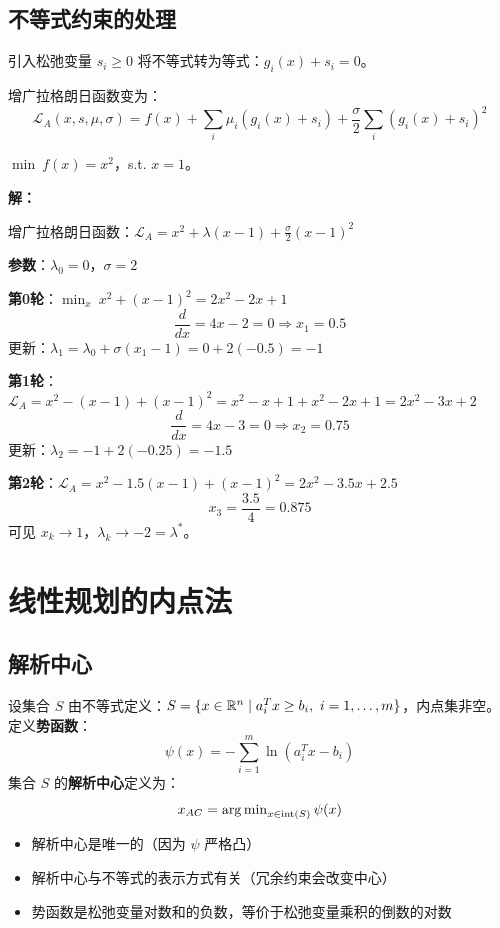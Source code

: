 \subsection{不等式约束的处理}

引入松弛变量 $s_i \geq 0$ 将不等式转为等式：$g_i(x) + s_i = 0$。

增广拉格朗日函数变为：
\[
\mathcal{L}_A(x, s, \mu, \sigma) = f(x) + \sum_i \mu_i(g_i(x) + s_i) + \frac{\sigma}{2}\sum_i (g_i(x) + s_i)^2
\]

\begin{example}\label{ex:alm}
$\min\ f(x) = x^2$，s.t. $x = 1$。

\textbf{解：}

增广拉格朗日函数：$\mathcal{L}_A = x^2 + \lambda(x-1) + \frac{\sigma}{2}(x-1)^2$

\textbf{参数}：$\lambda_0 = 0$，$\sigma = 2$

\textbf{第0轮}：$\min_x\ x^2 + (x-1)^2 = 2x^2 - 2x + 1$
\[
\frac{d}{dx} = 4x - 2 = 0 \Rightarrow x_1 = 0.5
\]
更新：$\lambda_1 = \lambda_0 + \sigma(x_1 - 1) = 0 + 2(-0.5) = -1$

\textbf{第1轮}：$\mathcal{L}_A = x^2 - (x-1) + (x-1)^2 = x^2 - x + 1 + x^2 - 2x + 1 = 2x^2 - 3x + 2$
\[
\frac{d}{dx} = 4x - 3 = 0 \Rightarrow x_2 = 0.75
\]
更新：$\lambda_2 = -1 + 2(-0.25) = -1.5$

\textbf{第2轮}：$\mathcal{L}_A = x^2 - 1.5(x-1) + (x-1)^2 = 2x^2 - 3.5x + 2.5$
\[
x_3 = \frac{3.5}{4} = 0.875
\]
可见 $x_k \to 1$，$\lambda_k \to -2 = \lambda^*$。
\end{example}

\section{线性规划的内点法}\label{sec:interior-point-lp}

\subsection{解析中心}

\begin{definition}
设集合 $S$ 由不等式定义：$S = \{x \in \mathbb{R}^n \mid a_i^T x \geq b_i,\ i = 1, \ldots, m\}$，内点集非空。定义\textbf{势函数}：
\[
\psi(x) = -\sum_{i=1}^{m} \ln(a_i^T x - b_i)
\]
集合 $S$ 的\textbf{解析中心}定义为：
\[
x_{AC} = \operatorname{arg\,min}_{x \in \text{int}(S)} \psi(x)
\]
\end{definition}

\begin{property}[解析中心性质]
\begin{itemize}[itemsep=0.3em]
    \item 解析中心是唯一的（因为 $\psi$ 严格凸）
    \item 解析中心与不等式的表示方式有关（冗余约束会改变中心）
    \item 势函数是松弛变量对数和的负数，等价于松弛变量乘积的倒数的对数
\end{itemize}
\end{property}

